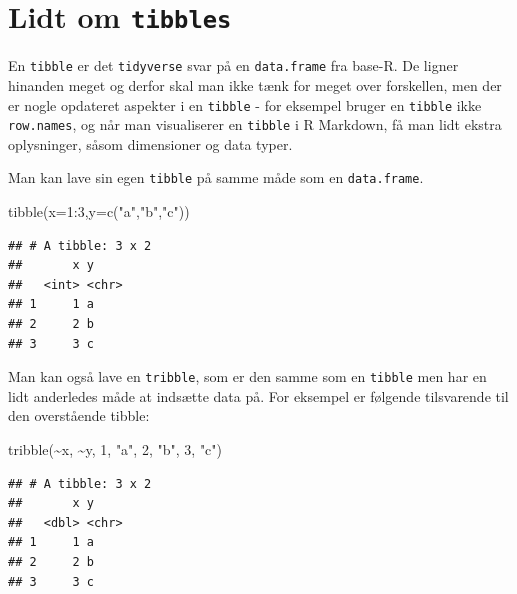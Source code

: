 \documentclass[
]{book}
\newenvironment{Shaded}{\begin{snugshade}}{\end{snugshade}}
\newcommand{\AttributeTok}[1]{\textcolor[rgb]{0.77,0.63,0.00}{#1}}
\newcommand{\DecValTok}[1]{\textcolor[rgb]{0.00,0.00,0.81}{#1}}
\newcommand{\FunctionTok}[1]{\textcolor[rgb]{0.00,0.00,0.00}{#1}}
\newcommand{\NormalTok}[1]{#1}
\newcommand{\SpecialCharTok}[1]{\textcolor[rgb]{0.00,0.00,0.00}{#1}}
\newcommand{\StringTok}[1]{\textcolor[rgb]{0.31,0.60,0.02}{#1}}
\begin{document}
\hypertarget{lidt-om-tibbles}{%
\section{\texorpdfstring{Lidt om \texttt{tibbles}}{Lidt om tibbles}}\label{lidt-om-tibbles}}

En \texttt{tibble} er det \texttt{tidyverse} svar på en \texttt{data.frame} fra base-R. De ligner hinanden meget og derfor skal man ikke tænk for meget over forskellen, men der er nogle opdateret aspekter i en \texttt{tibble} - for eksempel bruger en \texttt{tibble} ikke \texttt{row.names}, og når man visualiserer en \texttt{tibble} i R Markdown, få man lidt ekstra oplysninger, såsom dimensioner og data typer.

Man kan lave sin egen \texttt{tibble} på samme måde som en \texttt{data.frame}.

\begin{Shaded}
\begin{Highlighting}[]
\FunctionTok{tibble}\NormalTok{(}\AttributeTok{x=}\DecValTok{1}\SpecialCharTok{:}\DecValTok{3}\NormalTok{,}\AttributeTok{y=}\FunctionTok{c}\NormalTok{(}\StringTok{"a"}\NormalTok{,}\StringTok{"b"}\NormalTok{,}\StringTok{"c"}\NormalTok{))}
\end{Highlighting}
\end{Shaded}

\begin{verbatim}
## # A tibble: 3 x 2
##       x y    
##   <int> <chr>
## 1     1 a    
## 2     2 b    
## 3     3 c
\end{verbatim}

Man kan også lave en \texttt{tribble}, som er den samme som en \texttt{tibble} men har en lidt anderledes måde at indsætte data på. For eksempel er følgende tilsvarende til den overstående tibble:

\begin{Shaded}
\begin{Highlighting}[]
\FunctionTok{tribble}\NormalTok{(}\SpecialCharTok{\textasciitilde{}}\NormalTok{x, }\SpecialCharTok{\textasciitilde{}}\NormalTok{y,}
       \DecValTok{1}\NormalTok{, }\StringTok{"a"}\NormalTok{,}
       \DecValTok{2}\NormalTok{, }\StringTok{"b"}\NormalTok{,}
       \DecValTok{3}\NormalTok{, }\StringTok{"c"}\NormalTok{)}
\end{Highlighting}
\end{Shaded}

\begin{verbatim}
## # A tibble: 3 x 2
##       x y    
##   <dbl> <chr>
## 1     1 a    
## 2     2 b    
## 3     3 c
\end{verbatim}
\end{document}

